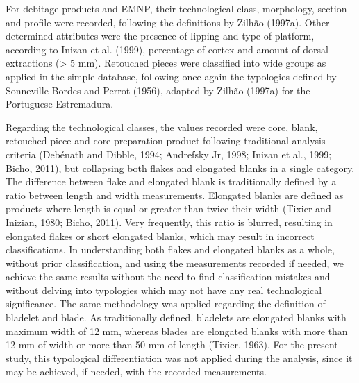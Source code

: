 \documentclass[12pt,twoside]{reedthesis}
\begin{document}
For debitage products and EMNP, their technological class, morphology, section and profile were recorded, following the definitions by Zilhão (1997a). Other determined attributes were the presence of lipping and type of platform, according to Inizan et al. (1999), percentage of cortex and amount of dorsal extractions (\textgreater{} 5 mm). Retouched pieces were classified into wide groups as applied in the simple database, following once again the typologies defined by Sonneville-Bordes and Perrot (1956), adapted by Zilhão (1997a) for the Portuguese Estremadura.

Regarding the technological classes, the values recorded were core, blank, retouched piece and core preparation product following traditional analysis criteria (Debénath and Dibble, 1994; Andrefsky Jr, 1998; Inizan et al., 1999; Bicho, 2011), but collapsing both flakes and elongated blanks in a single category. The difference between flake and elongated blank is traditionally defined by a ratio between length and width measurements. Elongated blanks are defined as products where length is equal or greater than twice their width (Tixier and Inizian, 1980; Bicho, 2011). Very frequently, this ratio is blurred, resulting in elongated flakes or short elongated blanks, which may result in incorrect classifications. In understanding both flakes and elongated blanks as a whole, without prior classification, and using the measurements recorded if needed, we achieve the same results without the need to find classification mistakes and without delving into typologies which may not have any real technological significance. The same methodology was applied regarding the definition of bladelet and blade. As traditionally defined, bladelets are elongated blanks with maximum width of 12 mm, whereas blades are elongated blanks with more than 12 mm of width or more than 50 mm of length (Tixier, 1963). For the present study, this typological differentiation was not applied during the analysis, since it may be achieved, if needed, with the recorded measurements.
\end{document}
